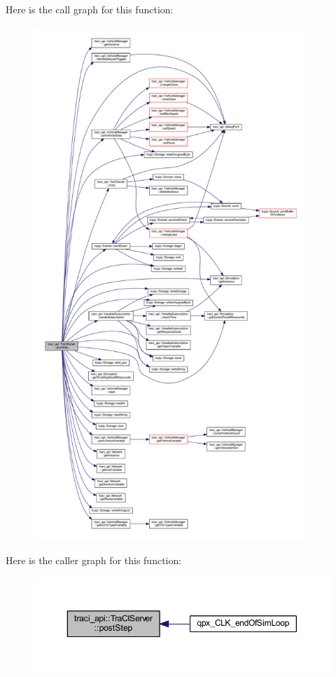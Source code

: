 Here is the call graph for this function\+:
\nopagebreak
\begin{figure}[H]
\begin{center}
\leavevmode
\includegraphics[height=550pt]{classtraci__api_1_1_tra_c_i_server_af4814a9a99d79f4e00fc102169d10cc2_cgraph}
\end{center}
\end{figure}
Here is the caller graph for this function\+:
\nopagebreak
\begin{figure}[H]
\begin{center}
\leavevmode
\includegraphics[width=350pt]{classtraci__api_1_1_tra_c_i_server_af4814a9a99d79f4e00fc102169d10cc2_icgraph}
\end{center}
\end{figure}
\mbox{\label{classtraci__api_1_1_tra_c_i_server_a8cd79e7da542e4abccc75d4933331d20}} 
